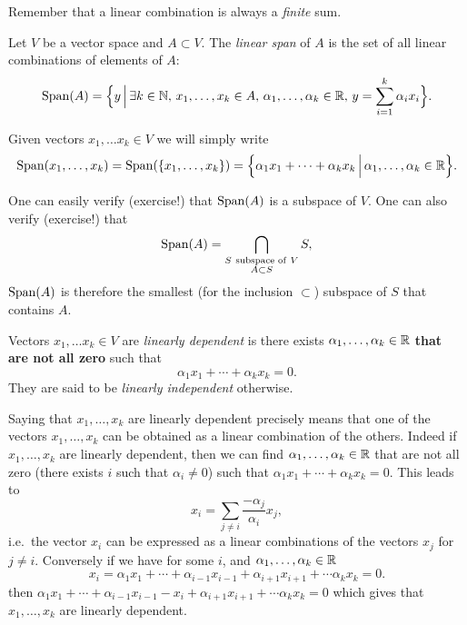 \documentclass[11pt,nocut]{article}
\begin{document}
Remember that a linear combination is always a \emph{finite} sum.

\begin{definition}[Span]
	Let $V$ be a vector space and $A \subset V$. The \emph{linear span} of $A$ is the set of all linear combinations of elements of $A$:
	$$
	{{\rm Span}}(A) = 
	\Big\{ y \, \Big| \, \exists k \in \mathbb{N}, \, x_1, \dots, x_k \in A, \, \alpha_1, \dots, \alpha_k \in \mathbb{R}, \, y = \sum_{i=1}^k \alpha_i x_i \Big\}.
	$$
\end{definition}
	Given vectors $x_1, \dots x_k \in V$ we will simply write
	$$
	{{\rm Span}}(x_1, \dots, x_k) = {{\rm Span}}(\{x_1, \dots, x_k \}) =
	\Big\{ \alpha_1 x_1 + \cdots + \alpha_k x_k \, \Big| \, \alpha_1, \dots, \alpha_k \in \mathbb{R} \Big\}.
	$$

	One can easily verify (exercise!) that ${{\rm Span}}(A)$ is a subspace of $V$. One can also verify (exercise!) that
$$
{{\rm Span}}(A) = \bigcap_{\substack{S \ \text{subspace of} \ V \\ A \subset S}} S,
$$
${{\rm Span}}(A)$ is therefore the smallest (for the inclusion $\subset$) subspace of $S$ that contains $A$.

\begin{definition}
	Vectors $x_1, \dots x_k \in V$ are \emph{linearly dependent} is there exists $\alpha_1, \dots, \alpha_k \in \mathbb{R}$ \textbf{that are not all zero} such that 
	$$
	\alpha_1 x_1 + \cdots + \alpha_k x_k = 0.
	$$
	They are said to be \emph{linearly independent} otherwise.
\end{definition}

Saying that $x_1, \dots, x_k$ are linearly dependent precisely means that one of the vectors $x_1, \dots, x_k$ can be obtained as a linear combination of the others. 
Indeed if $x_1, \dots, x_k$ are linearly dependent, then we can find $\alpha_1, \dots, \alpha_k \in \mathbb{R}$ that are not all zero (there exists $i$ such that $\alpha_i \neq 0$) such that $\alpha_1 x_1 + \cdots + \alpha_k x_k = 0$. This leads to
$$
x_i = \sum_{j \neq i} \frac{- \alpha_j}{\alpha_i} x_j,
$$
i.e.\ the vector $x_i$ can be expressed as a linear combinations of the vectors $x_j$ for $j \neq i$.
Conversely if we have for some $i$, and $\alpha_1, \dots, \alpha_k \in \mathbb{R}$
$$
x_i = \alpha_1 x_1 + \cdots + \alpha_{i-1} x_{i-1} + \alpha_{i+1} x_{i+1} + \cdots \alpha_k x_k = 0.
$$
then $\alpha_1 x_1 + \cdots + \alpha_{i-1} x_{i-1} - x_i + \alpha_{i+1} x_{i+1} + \cdots \alpha_k x_k = 0$ which gives that $x_1, \dots, x_k$ are linearly dependent. 
\\
\end{document}
